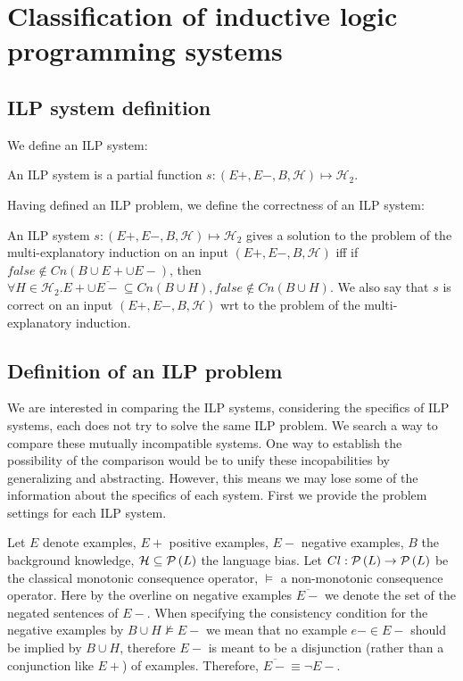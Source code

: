 \chapter{Classification of inductive logic programming systems}
\label{chap:classification_of_ilp_systems}

\section{ILP system definition}
We define an ILP system:
\begin{defn}
An ILP system is a partial function $s:(E+,E-,B, \mathcal{H}) \mapsto \mathcal{H}_2$.
\end{defn}
Having defined an ILP problem, we define the correctness of an ILP system:
\begin{defn}
An ILP system $s:(E+,E-,B, \mathcal{H}) \mapsto \mathcal{H}_2$ gives a solution to the problem of the multi-explanatory induction on an input $(E+,E-,B, \mathcal{H})$ iff if $false \not\in Cn(B \cup E+ \cup E-)$,
then $\forall H \in \mathcal{H}_2. E+ \cup \overline{E-} \subseteq Cn(B \cup H), false \not\in Cn(B \cup H)$. We also say that $s$ is correct on an input $(E+,E-,B, \mathcal{H})$ wrt to the problem of the multi-explanatory induction.
\end{defn}

\section{Definition of an ILP problem}
We are interested in comparing the ILP systems, considering the specifics of ILP systems, each does not try to solve the same ILP problem. We search a way to compare these mutually incompatible systems. One way to establish the possibility of the comparison would be to unify these incopabilities by generalizing and abstracting. However, this means we may lose some of the information about the specifics of each system. First we provide the problem settings for each ILP system.

Let $E$ denote examples, $E+$ positive examples, $E-$ negative examples, $B$ the background knowledge, $\mathcal{H} \subseteq \mathcal{P} \left({ L }\right)$ the language bias. Let $Cl:\mathcal{P} \left({ L }\right) \to \mathcal{P} \left({ L }\right)$ be the classical monotonic consequence operator, $\models$ a non-monotonic consequence operator. Here by the overline on negative examples $\overline{E-}$ we denote the set of the negated sentences of $E-$. When specifying the consistency condition for the negative examples by $B \cup H \not\models E-$ we mean that no example $e- \in E-$ should be implied by $B \cup H$, therefore $E-$ is meant to be a disjunction (rather than a conjunction like $E+$) of examples. Therefore, $\overline{E-} \equiv \neg E-$.

